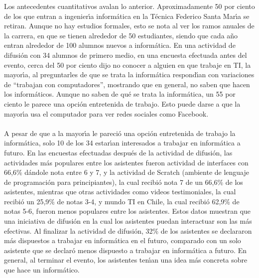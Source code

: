 \documentclass[letterpaper,12pt]{report} %
\numberwithin{equation}{section} %
\numberwithin{figure}{section} %
\numberwithin{table}{section} %
\begin{document}
Los antecedentes cuantitativos avalan lo anterior. Aproximadamente 50 por ciento de los que entran a ingenier\'{\i}a inform\'atica en la T\'ecnica Federico Santa Mar\'{\i}a se retiran. Aunque no hay estudios formales, esto se nota al ver los ramos anuales de la carrera, en que se tienen alrededor de 50 estudiantes, siendo que cada a\~no entran alrededor de 100 alumnos nuevos a inform\'atica. En una actividad de difusi\'on con 34 alumnos de primero medio, en una encuesta efectuada antes del evento, cerca del 50 por ciento dijo no conocer a alguien en que trabaje en TI, la mayor\'{\i}a, al preguntarles de que se trata la inform\'atica respond\'{\i}an con variaciones de ``trabajan con computadores'', mostrando que en general, no saben que hacen los inform\'aticos. Aunque no saben de qu\'e se trata la inform\'atica, un 55 por ciento le parece una opci\'on entretenida de trabajo. Esto puede darse a que la mayor\'{\i}a usa el computador para ver redes sociales como Facebook.\\~\\
A pesar de que a la mayor\'{\i}a le pareci\'o una opci\'on entretenida de trabajo la inform\'atica, solo 10 de los 34 estar\'{\i}an interesados a trabajar en inform\'atica a futuro. En las encuestas efectuadas despu\'es de la actividad de difusi\'on, las actividades m\'as populares entre los asistentes fueron actividad de interfaces con 66,6\% d\'andole nota entre 6 y 7, y la actividad de Scratch (ambiente de lenguaje de programaci\'on para principiantes), la cual recibi\'o nota 7 de un 66,6\% de los asistentes, mientras que otras actividades como videos testimoniales, la cual recibi\'o un 25,9\% de notas 3-4, y mundo TI en Chile, la cual recibi\'o 62,9\% de notas 5-6, fueron menos populares entre los asistentes. Estos datos muestran que una iniciativa de difusi\'on en la cual los asistentes puedan interactuar son las m\'as efectivas. Al finalizar la actividad de difusi\'on, 32\% de los asistentes se declararon m\'as dispuestos a trabajar en inform\'atica en el futuro, comparado con un solo asistente que se declar\'o menos dispuesto a trabajar en inform\'atica a futuro. En general, al terminar el evento, los asistentes ten\'{\i}an una idea m\'as concreta sobre que hace un inform\'atico.

\newpage
\end{document}
